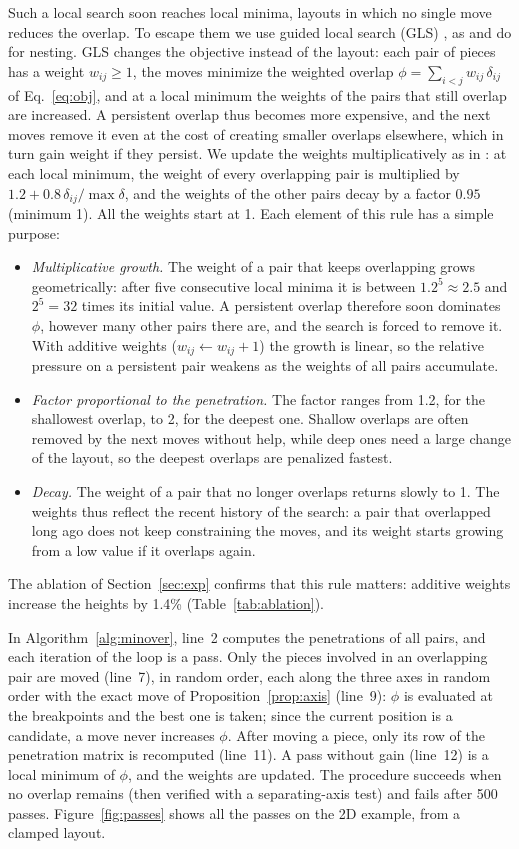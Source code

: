 \documentclass[preprint,12pt,authoryear]{elsarticle}
\begin{document}
Such a local search soon reaches local minima, layouts in which no single move reduces the overlap. To escape
them we use guided local search (GLS) \citep{voudouris1999}, as \citet{egeblad2007} and \citet{umetani2009} do
for nesting. GLS changes the objective instead of the layout: each pair of pieces has a weight $w_{ij}\ge1$, the
moves minimize the weighted overlap $\phi=\sum_{i<j}w_{ij}\,\delta_{ij}$ of Eq.~\eqref{eq:obj}, and at a local
minimum the weights of the pairs that still overlap are increased. A persistent overlap thus becomes more
expensive, and the next moves remove it even at the cost of creating smaller overlaps elsewhere, which in turn
gain weight if they persist. We update the weights multiplicatively as in \citet{gardeyn2025}: at each local
minimum, the weight of every overlapping pair is multiplied by $1.2+0.8\,\delta_{ij}/\max\delta$, and the weights
of the other pairs decay by a factor $0.95$ (minimum 1). All the weights start at 1. Each element of this rule has
a simple purpose:
\begin{itemize}
\item \emph{Multiplicative growth.} The weight of a pair that keeps overlapping grows geometrically: after five
consecutive local minima it is between $1.2^5\approx2.5$ and $2^5=32$ times its initial value. A persistent overlap
therefore soon dominates $\phi$, however many other pairs there are, and the search is forced to remove it. With
additive weights ($w_{ij}\gets w_{ij}+1$) the growth is linear, so the relative pressure on a persistent pair
weakens as the weights of all pairs accumulate.
\item \emph{Factor proportional to the penetration.} The factor ranges from 1.2, for the shallowest overlap, to 2,
for the deepest one. Shallow overlaps are often removed by the next moves without help, while deep ones need a
large change of the layout, so the deepest overlaps are penalized fastest.
\item \emph{Decay.} The weight of a pair that no longer overlaps returns slowly to 1. The weights thus reflect the
recent history of the search: a pair that overlapped long ago does not keep constraining the moves, and its
weight starts growing from a low value if it overlaps again.
\end{itemize}
The ablation of Section~\ref{sec:exp} confirms that this rule matters: additive weights increase the heights by
1.4\% (Table~\ref{tab:ablation}).

In Algorithm~\ref{alg:minover}, line~2 computes the penetrations of all pairs, and each iteration of the loop is
a pass. Only the pieces involved in an overlapping pair are moved (line~7), in random order, each along the three
axes in random order with the exact move of Proposition~\ref{prop:axis} (line~9): $\phi$ is evaluated at the
breakpoints and the best one is taken; since the current position is a candidate, a move never increases $\phi$.
After moving a piece, only its row of the penetration matrix is recomputed (line~11). A pass without gain
(line~12) is a local minimum of $\phi$, and the weights are updated. The procedure succeeds when no overlap
remains (then verified with a separating-axis test) and fails after 500 passes. Figure~\ref{fig:passes} shows all
the passes on the 2D example, from a clamped layout.
\end{document}

